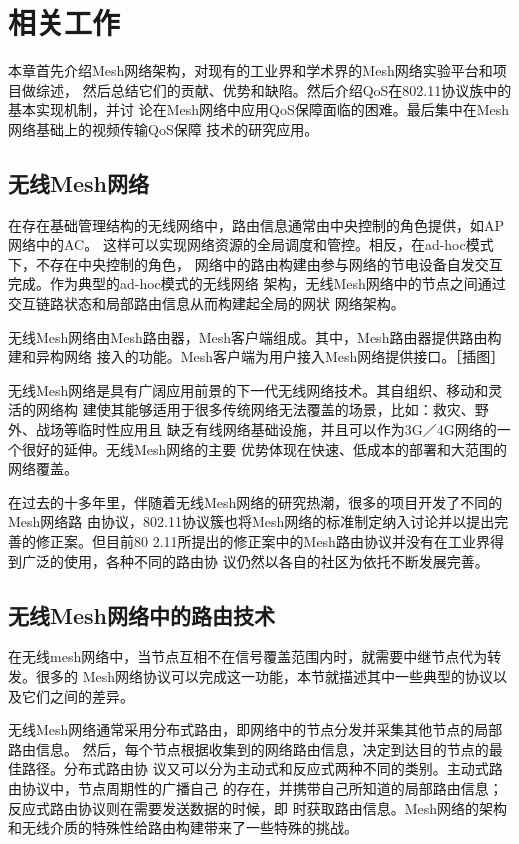 \chapter{相关工作}
\label{cha:china}
本章首先介绍Mesh网络架构，对现有的工业界和学术界的Mesh网络实验平台和项目做综述，
然后总结它们的贡献、优势和缺陷。然后介绍QoS在802.11协议族中的基本实现机制，并讨
论在Mesh网络中应用QoS保障面临的困难。最后集中在Mesh网络基础上的视频传输QoS保障
技术的研究应用。

\section{无线Mesh网络}
在存在基础管理结构的无线网络中，路由信息通常由中央控制的角色提供，如AP网络中的AC。
这样可以实现网络资源的全局调度和管控。相反，在ad-hoc模式下，不存在中央控制的角色，
网络中的路由构建由参与网络的节电设备自发交互完成。作为典型的ad-hoc模式的无线网络
架构，无线Mesh网络中的节点之间通过交互链路状态和局部路由信息从而构建起全局的网状
网络架构。

无线Mesh网络由Mesh路由器，Mesh客户端组成。其中，Mesh路由器提供路由构建和异构网络
接入的功能。Mesh客户端为用户接入Mesh网络提供接口。［插图］

无线Mesh网络是具有广阔应用前景的下一代无线网络技术。其自组织、移动和灵活的网络构
建使其能够适用于很多传统网络无法覆盖的场景，比如：救灾、野外、战场等临时性应用且
缺乏有线网络基础设施，并且可以作为3G／4G网络的一个很好的延伸。无线Mesh网络的主要
优势体现在快速、低成本的部署和大范围的网络覆盖。

在过去的十多年里，伴随着无线Mesh网络的研究热潮，很多的项目开发了不同的Mesh网络路
由协议，802.11协议簇也将Mesh网络的标准制定纳入讨论并以提出完善的修正案。但目前80
2.11所提出的修正案中的Mesh路由协议并没有在工业界得到广泛的使用，各种不同的路由协
议仍然以各自的社区为依托不断发展完善。

\section{无线Mesh网络中的路由技术}
在无线mesh网络中，当节点互相不在信号覆盖范围内时，就需要中继节点代为转发。很多的
Mesh网络协议可以完成这一功能，本节就描述其中一些典型的协议以及它们之间的差异。

无线Mesh网络通常采用分布式路由，即网络中的节点分发并采集其他节点的局部路由信息。
然后，每个节点根据收集到的网络路由信息，决定到达目的节点的最佳路径。分布式路由协
议又可以分为主动式和反应式两种不同的类别。主动式路由协议中，节点周期性的广播自己
的存在，并携带自己所知道的局部路由信息；反应式路由协议则在需要发送数据的时候，即
时获取路由信息。Mesh网络的架构和无线介质的特殊性给路由构建带来了一些特殊的挑战。

